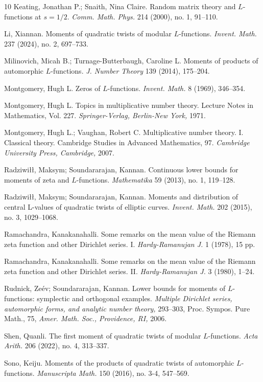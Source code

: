 \documentclass[12pt,reqno]{amsart}
\numberwithin{equation}{section}
\theoremstyle{plain}
\theoremstyle{definition}
\theoremstyle{remark}
\begin{document}
\begin{thebibliography}{10}
Keating, Jonathan P.; Snaith, Nina Claire.
Random matrix theory and $L$-functions at $s=1/2$.
\emph{Comm. Math. Phys.} 214 (2000), no. 1, 91--110.

Li, Xiannan.
Moments of quadratic twists of modular $L$-functions.
\emph{Invent. Math.} 237 (2024), no. 2, 697--733.

Milinovich, Micah B.; Turnage-Butterbaugh, Caroline L.
Moments of products of automorphic $L$-functions.
\emph{J. Number Theory} 139 (2014), 175--204.

Montgomery, Hugh L.
Zeros of $L$-functions.
\emph{Invent. Math.} 8 (1969), 346--354.

Montgomery, Hugh L.
Topics in multiplicative number theory. Lecture Notes in Mathematics, Vol. 227. \emph{Springer-Verlag, Berlin-New York,} 1971.

Montgomery, Hugh L.; Vaughan, Robert C.
Multiplicative number theory. I. Classical theory.
Cambridge Studies in Advanced Mathematics, 97. \emph{Cambridge University Press, Cambridge,} 2007.

Radziwi{\l \l}, Maksym; Soundararajan, Kannan. Continuous lower bounds for moments of zeta and $L$-functions.
\emph{Mathematika} 59 (2013), no. 1, 119--128.

Radziwi{\l \l}, Maksym; Soundararajan, Kannan.
Moments and distribution of central L-values of quadratic twists of elliptic curves.
\emph{Invent. Math.} 202 (2015), no. 3, 1029--1068.

Ramachandra, Kanakanahalli.
Some remarks on the mean value of the Riemann zeta function and other Dirichlet series. I.
\emph{Hardy-Ramanujan J.} 1 (1978), 15 pp.

Ramachandra, Kanakanahalli.
Some remarks on the mean value of the Riemann zeta function and other Dirichlet series. II.
\emph{Hardy-Ramanujan J.} 3 (1980), 1--24.

Rudnick, Ze\'ev; Soundararajan, Kannan.
Lower bounds for moments of $L$-functions: symplectic and orthogonal examples.
\emph{Multiple Dirichlet series, automorphic forms, and analytic number theory,} 293–303, Proc. Sympos. Pure Math., 75, \emph{Amer. Math. Soc., Providence, RI,} 2006.

Shen, Quanli.
The first moment of quadratic twists of modular $L$-functions.
\emph{Acta Arith.} 206 (2022), no. 4, 313--337.

Sono, Keiju.
Moments of the products of quadratic twists of automorphic $L$-functions.
\emph{Manuscripta Math.} 150 (2016), no. 3-4, 547--569.


\end{thebibliography}
\end{document}
